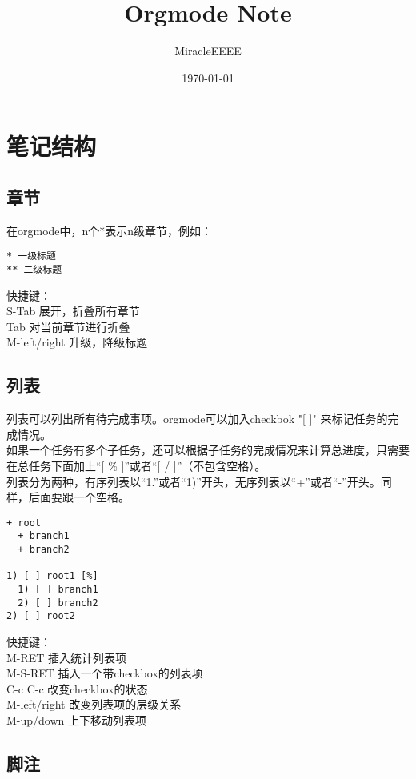 \documentclass[11pt]{article}
\author{MiracleEEEE}
\date{\today}
\title{Orgmode Note}
\begin{document}
\maketitle
\tableofcontents

\section{笔记结构}
\label{sec-1}

\subsection{章节}
\label{sec-1-1}

在orgmode中，n个*表示n级章节，例如：
\begin{verbatim}
* 一级标题
** 二级标题
\end{verbatim}
快捷键：\\
S-Tab 展开，折叠所有章节\\
Tab 对当前章节进行折叠\\
M-left/right 升级，降级标题\\

\subsection{列表}
\label{sec-1-2}

列表可以列出所有待完成事项。orgmode可以加入checkbok "[ ]" 来标记任务的完成情况。\\
如果一个任务有多个子任务，还可以根据子任务的完成情况来计算总进度，只需要在总任务下面加上“[ \% ]”或者“[ / ]”（不包含空格）。\\
列表分为两种，有序列表以“1.”或者“1)”开头，无序列表以“+”或者“-”开头。同样，后面要跟一个空格。\\
\begin{verbatim}
+ root
  + branch1
  + branch2

1) [ ] root1 [%]
  1) [ ] branch1
  2) [ ] branch2
2) [ ] root2
\end{verbatim}
快捷键：\\
M-RET 插入统计列表项\\
M-S-RET 插入一个带checkbox的列表项\\
C-c C-c 改变checkbox的状态\\
M-left/right 改变列表项的层级关系\\
M-up/down 上下移动列表项\\

\subsection{脚注}
\label{sec-1-3}
\end{document}

